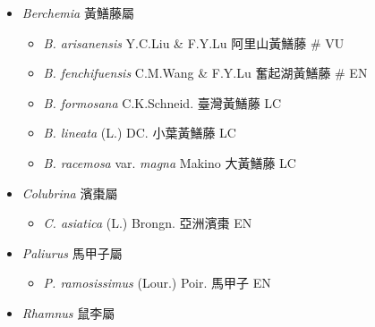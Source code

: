 
  \begin{itemize}
 \item[] \textit{Berchemia} 黃鱔藤屬
                                
  \begin{itemize}
        \item[] \textit{B. arisanensis} Y.C.Liu \& F.Y.Lu  阿里山黃鱔藤  \# VU
        \item[] \textit{B. fenchifuensis} C.M.Wang \& F.Y.Lu  奮起湖黃鱔藤  \# EN
        \item[] \textit{B. formosana} C.K.Schneid.  臺灣黃鱔藤   LC
        \item[] \textit{B. lineata} (L.) DC.  小葉黃鱔藤   LC
        \item[] \textit{B. racemosa} var. \textit{magna} Makino  大黃鱔藤   LC
  \end{itemize}
 \item[] \textit{Colubrina} 濱棗屬
                                
  \begin{itemize}
        \item[] \textit{C. asiatica} (L.) Brongn.  亞洲濱棗   EN
  \end{itemize}
 \item[] \textit{Paliurus} 馬甲子屬
                                
  \begin{itemize}
        \item[] \textit{P. ramosissimus} (Lour.) Poir.  馬甲子   EN
  \end{itemize}
 \item[] \textit{Rhamnus} 鼠李屬
                                

\end{itemize}
